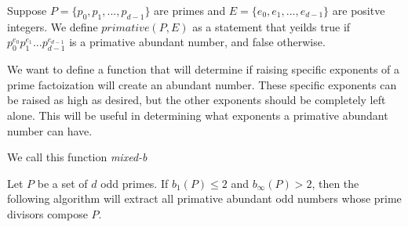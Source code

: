 \documentclass[../paper.tex]{subfiles}
\begin{document}
Suppose $P = \{p_0, p_1, ...,p_{d-1}\}$ are primes and 
$E = \{e_0, e_1, ..., e_{d-1} \}$ are positve integers.
We define $primative(P,E)$ as a statement that yeilds true
if $p_0^{e_0} p_1^{e_1} ... p_{d-1}^{e_{d-1}}$ is a primative
abundant number, and false otherwise.


We want to define a function that will determine if raising specific
exponents of a prime factoization will create an abundant number.
These specific exponents can be raised as high as desired, but
the other exponents should be completely left alone. This will
be useful in determining what exponents a primative abundant number
can have.

We call this function \textit{mixed-b} 


\begin{theorem} 
Let $P$ be a set of $d$ odd primes. If $b_{1}(P) \leq 2$
and $b_{\infty}(P) > 2$, then the following algorithm will extract all primative
abundant odd numbers whose prime divisors compose $P$.
\end{theorem}
%
%
%
%
%

\end{document}
